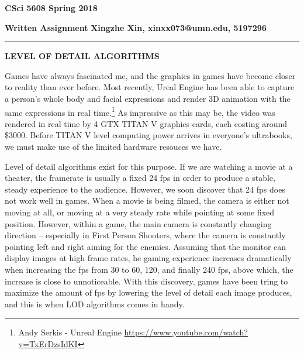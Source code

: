 \documentclass[12pt]{article}
\begin{document}
	\begin{center}
		{\Large \bf CSci 5608 Spring 2018}
	\end{center}
\medskip

{\bf Written Assignment}
\hfill
{\bf Xingzhe Xin, xinxx073@umn.edu, 5197296}
\hrule
\bigskip

\begin{center}
{\bfseries LEVEL OF DETAIL ALGORITHMS}
\end{center}

Games have always fascinated me, and the graphics in games have become closer to reality than ever
before. Most recently, Ureal Engine has been able to capture a person's whole body and facial expressions
and render 3D animation with the same expressions in real time.\footnote{Andy Serkis - Unreal 
Engine \url{https://www.youtube.com/watch?v=TxErDzsIdKI}} As impressive as this may be, the video
was rendered in real time by 4 GTX TITAN V graphics cards, each costing around \$3000. Before TITAN V level computing power
arrives in everyone's ultrabooks, we must make use of the limited hardware resouces we have. \par

Level of detail algorithms exist for this purpose. If we are watching a movie at a theater, the framerate is usually a fixed 24 fps
in order to produce a stable, steady experience to the audience. However, we soon discover that 24 fps does not work well in games.
When a movie is being filmed, the camera is either not moving at all, or moving at a very steady rate while pointing at some fixed position.
However, within a game, the main camera is constantly changing direction --  especially in First Person Shooters, where the camera
is constantly pointing left and right aiming for the enemies. Assuming that the monitor can display images at high frame rates,
he gaming experience increases dramatically when increasing the fps from 30 to 60, 120, and finally 240 fps, above which, the
increase is close to unnoticeable. With this discovery, games have been tring to maximize the amount of fps by lowering the level
of detail each image produces, and this is when LOD algorithms comes in handy. \par
\end{document}
